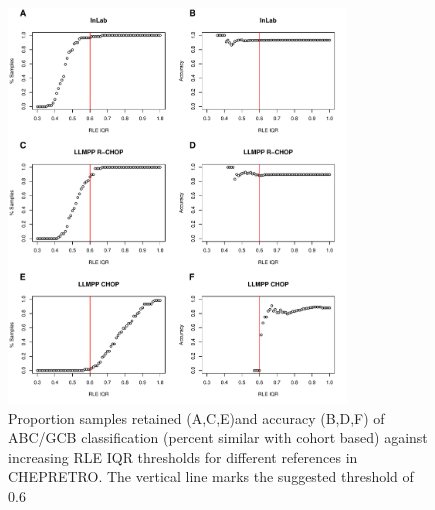\begin{figure}
	\begin{center}
		\includegraphics[width=0.8\textwidth]{figures/chep_rle_classification_abcgcb.pdf}
	\end{center}
	\caption{Proportion samples retained (A,C,E)and accuracy (B,D,F) of ABC/GCB classification (percent similar with cohort based) against increasing RLE IQR thresholds for different references in CHEPRETRO. The vertical line marks the suggested threshold of 0.6}
	\label{fig:chep_rle_clas_abcgcb}
\end{figure}

